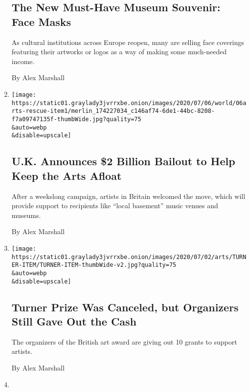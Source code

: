 \begin{enumerate}
  \hypertarget{the-new-must-have-museum-souvenir-face-masks}{%
  \subsection{The New Must-Have Museum Souvenir: Face
  Masks}\label{the-new-must-have-museum-souvenir-face-masks}}

  As cultural institutions across Europe reopen, many are selling face
  coverings featuring their artworks or logos as a way of making some
  much-needed income.

  By Alex Marshall
\item
  \href{/2020/07/06/arts/uk-rescue-package.html}{}

  \texttt{[image: https://static01.graylady3jvrrxbe.onion/images/2020/07/06/world/06arts-rescue-item1/merlin\_174227034\_c146af74-6de1-44bc-8208-f7a09747135f-thumbWide.jpg?quality=75\\\&auto=webp\\\&disable=upscale]}

  \hypertarget{uk-announces-2-billion-bailout-to-help-keep-the-arts-afloat}{%
  \subsection{U.K. Announces \$2 Billion Bailout to Help Keep the Arts
  Afloat}\label{uk-announces-2-billion-bailout-to-help-keep-the-arts-afloat}}

  After a weekslong campaign, artists in Britain welcomed the move,
  which will provide support to recipients like ``local basement'' music
  venues and museums.

  By Alex Marshall
\item
  \href{/2020/07/02/arts/design/turner-prize-coronavirus-bursaries.html}{}

  \texttt{[image: https://static01.graylady3jvrrxbe.onion/images/2020/07/02/arts/TURNER-ITEM/TURNER-ITEM-thumbWide-v2.jpg?quality=75\\\&auto=webp\\\&disable=upscale]}

  \hypertarget{turner-prize-was-canceled-but-organizers-still-gave-out-the-cash}{%
  \subsection{Turner Prize Was Canceled, but Organizers Still Gave Out
  the
  Cash}\label{turner-prize-was-canceled-but-organizers-still-gave-out-the-cash}}

  The organizers of the British art award are giving out 10 grants to
  support artists.

  By Alex Marshall
\item
  \href{/2020/07/01/theater/britain-arts-future-coronavirus.html}{}


\end{enumerate}
